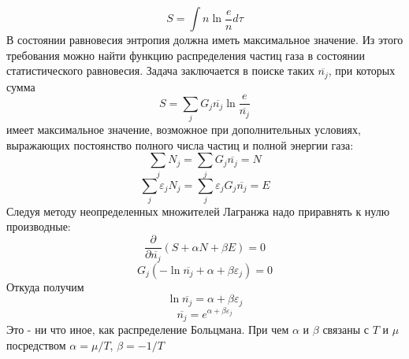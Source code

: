 $$
S = \int n \ln \frac{e}{n}d\tau
$$
В состоянии равновесия энтропия должна иметь максимальное значение. Из этого требования можно найти функцию распределения частиц газа  в состоянии статистического равновесия. Задача заключается в поиске таких $\overline{n_j}$, при которых сумма 
$$
S = \sum_{j}G_j\overline{n_j} \ln \frac{e}{\overline{n_j}}
$$
имеет максимальное значение, возможное при дополнительных условиях, выражающих постоянство полного числа частиц и полной энергии газа:
$$
\sum_{j}N_j = \sum_{j}G_j\overline{n_j} = N
$$
$$
\sum_{j}\varepsilon_jN_j = \sum_{j}\varepsilon_jG_j\overline{n_j} = E
$$
Следуя методу неопределенных множителей Лагранжа надо приравнять к нулю производные:
$$
\frac{\partial}{\partial\overline{n_j}} (S + \alpha N + \beta E) = 0
$$
$$
G_j(-\ln\overline{n_j} + \alpha + \beta \varepsilon_j) = 0
$$
Откуда получим 
$$
\ln\overline{n_j} = \alpha + \beta \varepsilon_j
$$
$$
\overline{n_j} = e ^{\alpha + \beta \varepsilon_j}
$$
Это - ни что иное, как распределение Больцмана. При чем $\alpha$ и $\beta$ связаны с $T$ и $\mu$ посредством $\alpha = \mu / T$, $\beta =  - 1 / T$
